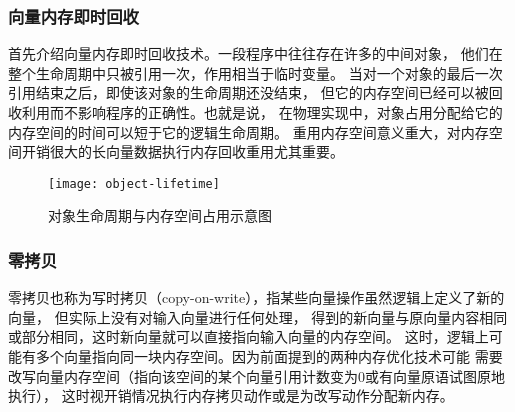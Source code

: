 \subsubsection{向量内存即时回收}
首先介绍向量内存即时回收技术。一段程序中往往存在许多的中间对象，
他们在整个生命周期中只被引用一次，作用相当于临时变量。
当对一个对象的最后一次引用结束之后，即使该对象的生命周期还没结束，
但它的内存空间已经可以被回收利用而不影响程序的正确性。也就是说，
在物理实现中，对象占用分配给它的内存空间的时间可以短于它的逻辑生命周期。
重用内存空间意义重大，对内存空间开销很大的长向量数据执行内存回收重用尤其重要。
\begin{quotation}
\end{quotation}
\begin{figure}
  \centering
  \texttt{[image: object-lifetime]}
  \caption{对象生命周期与内存空间占用示意图}
  \label{fig:object-lifetime}
\end{figure}

\subsubsection{零拷贝}
零拷贝也称为写时拷贝（copy-on-write），指某些向量操作虽然逻辑上定义了新的向量，
但实际上没有对输入向量进行任何处理，
得到的新向量与原向量内容相同或部分相同，这时新向量就可以直接指向输入向量的内存空间。
这时，逻辑上可能有多个向量指向同一块内存空间。因为前面提到的两种内存优化技术可能
需要改写向量内存空间（指向该空间的某个向量引用计数变为0或有向量原语试图原地执行），
这时视开销情况执行内存拷贝动作或是为改写动作分配新内存。


